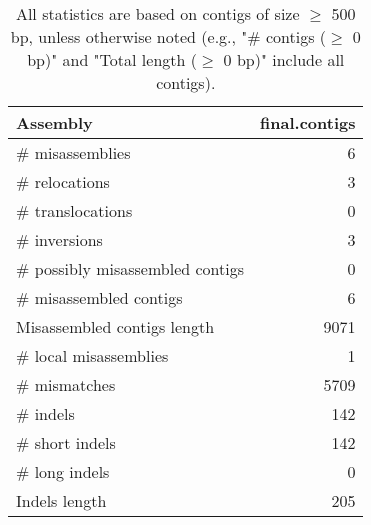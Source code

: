 \documentclass[12pt,a4paper]{article}
\begin{document}
\begin{table}[ht]
\begin{center}
\caption{All statistics are based on contigs of size $\geq$ 500 bp, unless otherwise noted (e.g., "\# contigs ($\geq$ 0 bp)" and "Total length ($\geq$ 0 bp)" include all contigs).}
\begin{tabular}{|l*{1}{|r}|}
\hline
Assembly & final.contigs \\ \hline
\# misassemblies & 6 \\ \hline
\hspace{5mm}\# relocations & 3 \\ \hline
\hspace{5mm}\# translocations & 0 \\ \hline
\hspace{5mm}\# inversions & 3 \\ \hline
\# possibly misassembled contigs & 0 \\ \hline
\# misassembled contigs & 6 \\ \hline
Misassembled contigs length & 9071 \\ \hline
\# local misassemblies & 1 \\ \hline
\# mismatches & 5709 \\ \hline
\# indels & 142 \\ \hline
\hspace{5mm}\# short indels & 142 \\ \hline
\hspace{5mm}\# long indels & 0 \\ \hline
Indels length & 205 \\ \hline
\end{tabular}
\end{center}
\end{table}
\end{document}
